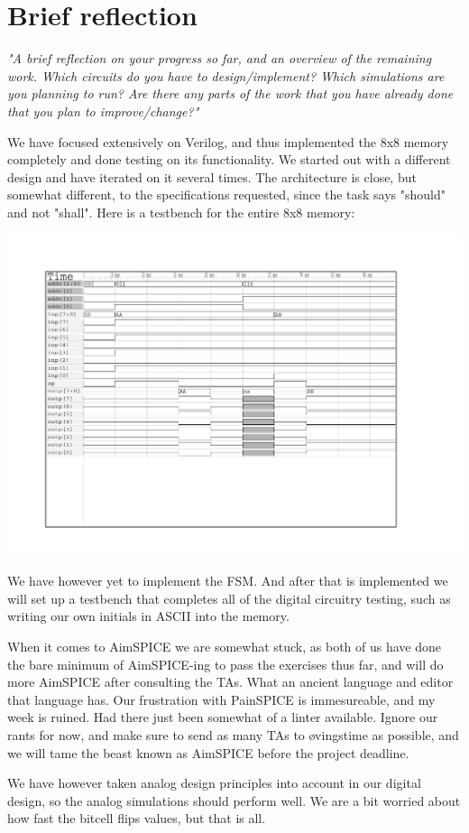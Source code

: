 \section{Brief reflection}
\textit{"A brief reflection on your progress so far, and an overview of the remaining work. Which circuits do you have to design/implement? Which simulations are you planning to run? Are there any parts of the work that you have already done that you plan to improve/change?"}

We have focused extensively on Verilog, and thus implemented the 8x8 memory completely and done testing on its functionality. We started out with a different design and have iterated on it several times. The architecture is close, but somewhat different, to the specifications requested, since the task says "should" and not "shall". Here is a testbench for the entire 8x8 memory:

\includegraphics[width=\textwidth]{verilog_mem8x8_latch/simple_testbenches/ram.pdf}

We have however yet to implement the FSM. And after that is implemented we will set up a testbench that completes all of the digital circuitry testing, such as writing our own initials in ASCII into the memory.

When it comes to AimSPICE we are somewhat stuck, as both of us have done the bare minimum of AimSPICE-ing to pass the exercises thus far, and will do more AimSPICE after consulting the TAs. What an ancient language and editor that language has. Our frustration with PainSPICE is immesureable, and my week is ruined. Had there just been somewhat of a linter available. Ignore our rants for now, and make sure to send as many TAs to øvingstime as possible, and we will tame the beast known as AimSPICE before the project deadline.

We have however taken analog design principles into account in our digital design, so the analog simulations should perform well. We are a bit worried about how fast the bitcell flips values, but that is all.
